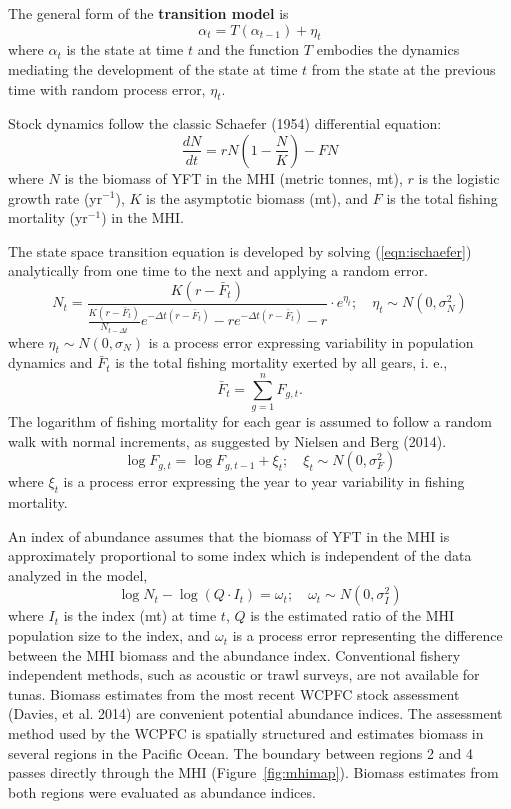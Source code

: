 \documentclass[12pt,letterpaper]{article}
\newcommand\peryr{yr$^{-1}$}
\begin{document}
The general form of the {\bf transition model} is
\begin{equation}
\alpha_t=T(\alpha_{t-1}) + \eta_t
\end{equation}
where $\alpha_t$ is the state at time $t$ and 
the function $T$ embodies the dynamics mediating the
development of the state at time $t$ from the state at the previous
time with random process error, $\eta_t$.

Stock dynamics follow the classic Schaefer (1954) differential equation:
\begin{equation}
\label{eqn:ischaefer}
\frac{dN}{dt} = rN(1-\frac{N}{K}) - FN
\end{equation}
where $N$ is the biomass of YFT in the MHI (metric tonnes, mt), 
$r$ is the logistic growth rate (\peryr),
$K$ is the asymptotic biomass (mt), and
$F$ is the total fishing mortality (\peryr) in the MHI.

The state space transition equation is developed by solving
(\ref{eqn:ischaefer}) analytically from one time to the next and
applying a random error.
\begin{equation}
\label{eqn:intschaeferA}
N_t = \frac{K(r-\bar{F}_t)}{\frac{K(r-\bar{F}_t)}{N_{t-\Delta t}}e^{-\Delta
t(r-\bar{F}_t)}-re^{-\Delta t(r-\bar{F}_t)} -r} \cdot e^{\eta_t};
\quad \eta_t\sim N(0,\sigma^2_N)
\end{equation}
where $\eta_t \sim N(0,\sigma_N)$ is a process error expressing
variability in population dynamics
and $\bar{F}_t$ is the total fishing mortality exerted by all gears, i. e.,
\begin{equation}
\bar{F}_t =\sum_{g=1}^n F_{g,t}.
\end{equation}
The logarithm of fishing mortality for each gear is assumed to
follow a random walk with normal increments, as suggested by Nielsen
and Berg (2014).
\begin{equation}
\label{eqn:Fwalk}
\log F_{g,t} = \log F_{g,t-1} + \xi_t;\quad \xi_t\sim
N(0,\sigma^2_F)
\end{equation}
where  $\xi_t$ is a process error expressing the year to year
variability in fishing mortality.

An index of abundance assumes that the biomass of YFT in the MHI
is approximately proportional to some index which is independent of
the data analyzed in the model,
\begin{equation}
\log N_t - \log (Q\cdot I_t) = \omega_t;\quad \omega_t\sim N(0,\sigma^2_I)
\label{eqn:index}
\end{equation}
where
$I_t$ is the index (mt) at time $t$,
$Q$ is the estimated ratio of the MHI population size to the index,
and $\omega_t$ is a process error representing the difference
between the MHI biomass and the abundance index. 
Conventional fishery independent methods, such as acoustic or trawl
surveys, are not available for tunas. 
Biomass estimates from the most recent WCPFC stock
assessment (Davies, et al. 2014) are convenient potential abundance
indices. The assessment method used by the
WCPFC is spatially structured and estimates biomass in several regions
in the Pacific Ocean. The boundary between regions 2 and 4 passes
directly through the MHI (Figure~\ref{fig:mhimap}).
Biomass estimates from both regions were evaluated as abundance indices.
\end{document}
